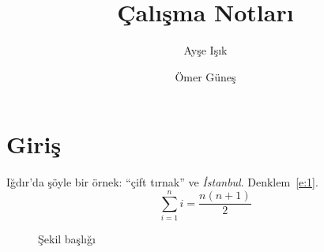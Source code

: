 \documentclass{article}
\title{Çalışma Notları}
\author{Ayşe Işık \and Ömer Güneş}
\begin{document}
\maketitle
\section{Giriş}
Iğdır'da şöyle bir örnek: ``çift tırnak'' ve \emph{İstanbul}. Denklem~\ref{e:1}.
\begin{equation}\label{e:1}
  \sum_{i=1}^{n} i = \frac{n(n+1)}{2}
\end{equation}
\begin{figure}
\centering
\caption{Şekil başlığı}
\end{figure}
\end{document}
